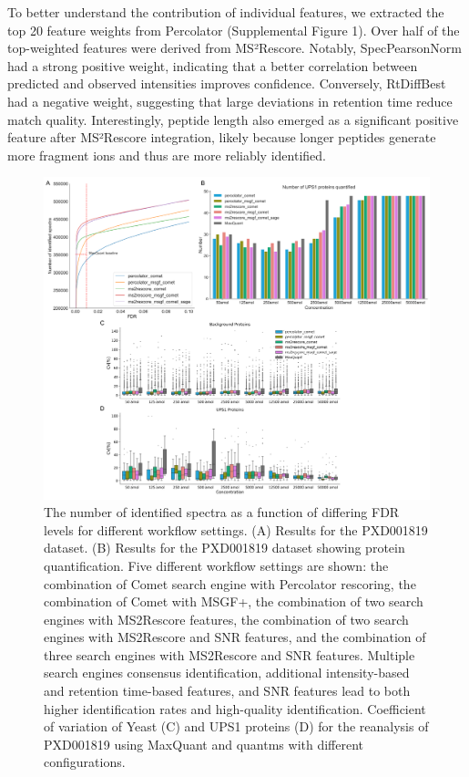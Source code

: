 \documentclass[12pt]{article}
\begin{document}
To better understand the contribution of individual features, we extracted the top 20 feature weights from Percolator (Supplemental Figure 1). Over half of the top-weighted features were derived from MS²Rescore. Notably, SpecPearsonNorm had a strong positive weight, indicating that a better correlation between predicted and observed intensities improves confidence. Conversely, RtDiffBest had a negative weight, suggesting that large deviations in retention time reduce match quality. Interestingly, peptide length also emerged as a significant positive feature after MS²Rescore integration, likely because longer peptides generate more fragment ions and thus are more reliably identified.

\begin{figure}[ht!]
	\centering
	\includegraphics[width=1\textwidth]{figures//PXD001819_V3.png}
	\caption{The number of identified spectra as a function of differing FDR levels for different workflow settings. (A) Results for the PXD001819 dataset. (B) Results for the PXD001819 dataset showing protein quantification. Five different workflow settings are shown: the combination of Comet search engine with Percolator rescoring, the combination of Comet with MSGF+, the combination of two search engines with MS2Rescore features, the combination of two search engines with MS2Rescore and SNR features, and the combination of three search engines with MS2Rescore and SNR features. Multiple search engines consensus identification, additional intensity-based and retention time-based features, and SNR features lead to both higher identification rates and high-quality identification. Coefficient of variation of Yeast (C) and UPS1 proteins (D) for the reanalysis of PXD001819 using MaxQuant and quantms with different configurations.}
	\label{fig:PXD001819_ms2rescore_pic}
\end{figure}
\end{document}
